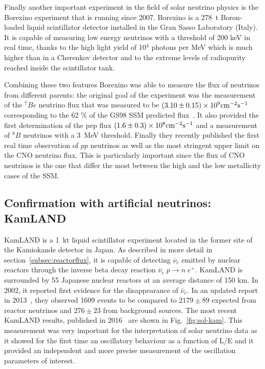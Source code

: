 Finally another important experiment in the field of solar neutrino physics is the Borexino experiment that is running since 2007. Borexino is a 278~t Boron-loaded liquid scintillator detector installed in the Gran Sasso Laboratory (Italy). 
It is capable of measuring low energy neutrinos with a threshold of 200 keV in real time, thanks to the high light yield of 10$^4$ photons per MeV which is much higher than in a Cherenkov detector and to the extreme levels of radiopurity reached inside the scintillator tank. 

Combining these two features Borexino was able to measure the flux of neutrinos from different parents: the original goal of the experiment was the measurement of the $^7Be$ neutrino flux that was measured to be $(3.10 \pm 0.15) \times 10^9 {\rm cm^{-2} s^{-1}}$ corresponding to the 62 \% of the GS98 SSM predicted flux~\cite{bellini}. It also provided the first determination of the pep flux 
$(1.6 \pm 0.3) \times 10^8 { \rm cm^{-2} s^{-1}}$ and a measurement of $^8B$ neutrinos with a 3~MeV threshold. 
Finally they recently published the first real time observation of $pp$ neutrinos 
as well as the most stringent upper limit on the CNO neutrino flux. This is particularly important since the flux of CNO neutrinos is the one that differ the most between the high and the low metallicity cases of the SSM.


\subsection{Confirmation with artificial neutrinos: KamLAND}

KamLAND is a 1~kt liquid scintillator experiment located in the former site of the Kamiokande detector in Japan. As described in more detail in section~\ref{subsec:reactorflux}, it is capable of detecting $\bar \nu_e$ emitted by nuclear reactors through the inverse beta decay reaction $\bar{\nu}_e \; p \rightarrow n \;  e^+$. KamLAND is surrounded by 55 Japanese nuclear reactors at an average distance of 150 km. In 2002, it reported first evidence for the disappearance  of $\bar \nu_e$. In an updated report in 2013~\cite{kamland}, they observed 1609 
events to be compared to $2179 \pm 89$ expected from reactor neutrinos and  $276 \pm 23$ from background sources.
The most recent KamLAND results, published in 2016~\cite{Gando:2013nba} are shown in Fig.~\ref{fig:sol-kam}. This measurement was very important for the interpretation of solar neutrino data as it showed for the first time an oscillatory behaviour as a function of L/E and it provided an independent and more precise measurement of the oscillation parameters of interest.



